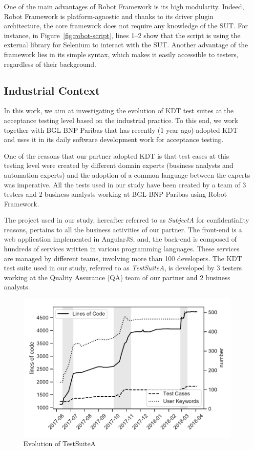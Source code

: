 One of the main advantages of Robot Framework is its high modularity.  Indeed, Robot Framework is platform-agnostic and thanks to its driver plugin architecture, the core framework does not require any knowledge of the SUT. For instance, in Figure~\ref{fig:robot-script}, lines 1--2 show that the script is using the external library for Selenium to interact with the SUT. Another advantage of the framework lies in its simple syntax, which makes it easily accessible to testers, regardless of their background.

\subsection{Industrial Context}
\label{sec:evolution-introduction-data}

In this work, we aim at investigating the evolution of KDT test suites at the acceptance testing level based on the industrial practice. To this end, we work together with BGL BNP Paribas that has recently (1 year ago) adopted KDT and uses it in its daily software development work for acceptance testing.

One of the reasons that our partner adopted KDT is that test cases at this testing level were created by different domain experts (business analysts and automation experts) and the adoption of a common language between the experts was imperative. All the tests used in our study have been created by a team of 3 testers and 2 business analysts working at BGL BNP Paribas using Robot Framework.

The project used in our study, hereafter referred to as \emph{SubjectA} for confidentiality reasons, pertains to all the business activities of our partner. The front-end is a web application implemented in AngularJS, and, the back-end is composed of hundreds of services written in various programming languages. These services are managed by different teams, involving more than 100 developers. The KDT test suite used in our study, referred to as \emph{TestSuiteA}, is developed by 3 testers working at the Quality Assurance (QA) team of our partner and 2 business analysts.

\begin{figure}[t!]
  \centering
  \includegraphics[width=0.7\columnwidth]{figures/evolution/project_evolution.pdf}
  \caption{Evolution of TestSuiteA}
  \label{fig:project_evolution}%
\end{figure}

